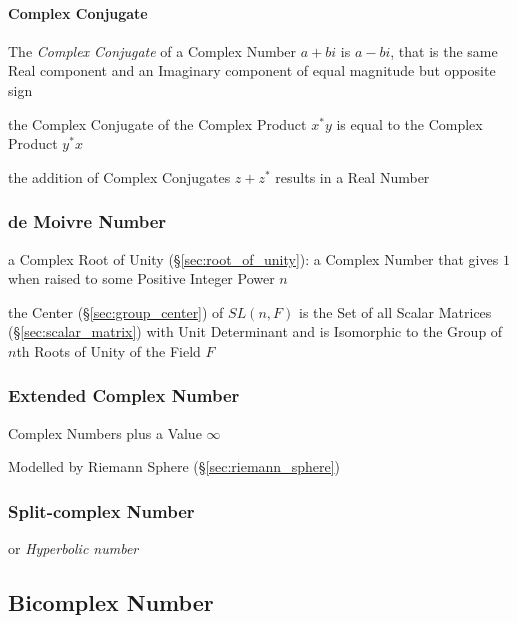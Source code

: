 \paragraph{Complex Conjugate}\label{sec:complex_conjugate}\hfill

The \emph{Complex Conjugate} of a Complex Number $a + bi$ is $a - bi$, that is
the same Real component and an Imaginary component of equal magnitude but
opposite sign

the Complex Conjugate of the Complex Product $x^*y$ is equal to the Complex
Product $y^*x$

the addition of Complex Conjugates $z + z^*$ results in a Real Number



\subsubsection{de Moivre Number}\label{sec:demoivre_number}

a Complex Root of Unity (\S\ref{sec:root_of_unity}):
a Complex Number that gives $1$ when raised to some Positive Integer Power $n$

the Center (\S\ref{sec:group_center}) of $SL(n,F)$ is the Set of all Scalar
Matrices (\S\ref{sec:scalar_matrix}) with Unit Determinant and is Isomorphic to
the Group of $n$th Roots of Unity of the Field $F$



\subsubsection{Extended Complex Number}\label{sec:extended_complex}

Complex Numbers plus a Value $\infty$

Modelled by Riemann Sphere (\S\ref{sec:riemann_sphere})



\subsubsection{Split-complex Number}\label{sec:split_complex}

or \emph{Hyperbolic number}



\subsection{Bicomplex Number}\label{sec:bicomplex_number}

